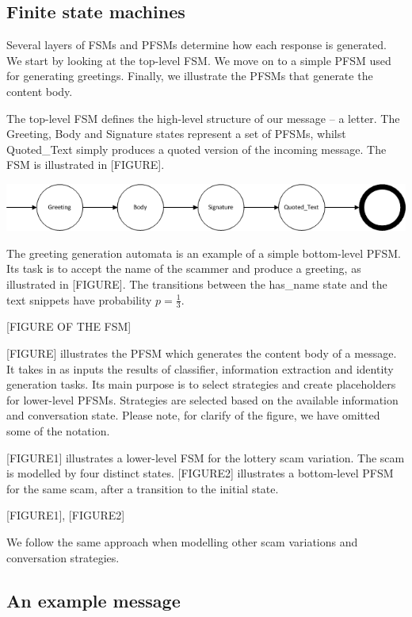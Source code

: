 \subsection{Finite state machines}

Several layers of FSMs and PFSMs determine how each response is generated. We start by looking at the top-level FSM. We move on to a simple PFSM used for generating greetings. Finally, we illustrate the PFSMs that generate the content body.

The top-level FSM defines the high-level structure of our message -- a letter. The Greeting, Body and Signature states represent a set of PFSMs, whilst Quoted\_Text simply produces a quoted version of the incoming message. The FSM is illustrated in [FIGURE].

\includegraphics[scale=0.75]{fsm-top-level.png}

The greeting generation automata is an example of a simple bottom-level PFSM. Its task is to accept the name of the scammer and produce a greeting, as illustrated in [FIGURE]. The transitions between the has\_name state and the text snippets have probability $p = \frac{1}{3}$.

[FIGURE OF THE FSM]

[FIGURE] illustrates the PFSM which generates the content body of a message. It takes in as inputs the results of classifier, information extraction and identity generation tasks. Its main purpose is to select strategies and create placeholders for lower-level PFSMs. Strategies are selected based on the available information and conversation state. Please note, for clarify of the figure, we have omitted some of the notation.

[FIGURE1] illustrates a lower-level FSM for the lottery scam variation. The scam is modelled by four distinct states. [FIGURE2] illustrates a bottom-level PFSM for the same scam, after a transition to the initial state.

[FIGURE1], [FIGURE2]

We follow the same approach when modelling other scam variations and conversation strategies.

\subsection{An example message}

